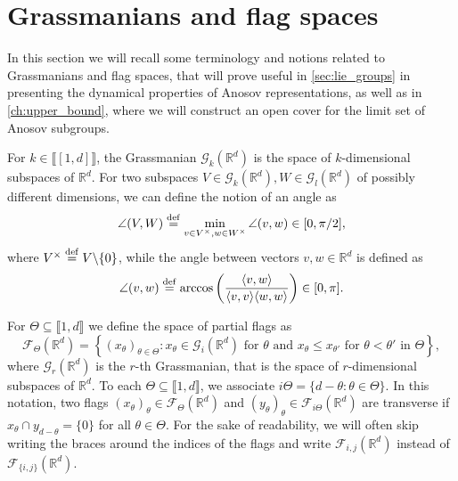 \documentclass{report}
\begin{document}
\section{Grassmanians and flag spaces}
In this section we will recall some terminology and notions related to Grassmanians and flag spaces, that will prove useful in \cref{sec:lie_groups} in presenting the dynamical properties of Anosov representations, as well as in \cref{ch:upper_bound}, where we will construct an open cover for the limit set of Anosov subgroups.

For $k \in \llbracket [1, d] \rrbracket$, the Grassmanian $\mathcal G_k(\mathbb R^d)$ is the space of $k$-dimensional subspaces of $\mathbb R^d$.
For two subspaces $V \in \mathcal G_k(\mathbb R^d), W \in \mathcal G_l(\mathbb R^d)$ of possibly different dimensions, we can define the notion of an angle as
\[
\angle (V, W) \overset{\mathrm{def}}{=} \min_{v \in V^\times, w \in W^\times} \angle(v,w) \in [0, \pi/2],
\]
where $V^\times \overset{\mathrm{def}}{=} V \backslash \{0\}$, while the angle between vectors $v, w \in \mathbb R^d$ is defined as
\[
\angle(v,w) \overset{\mathrm{def}}{=} \arccos \left( \frac{\langle v,w \rangle}{\langle v, v \rangle \langle w, w \rangle} \right) \in [0, \pi].
\]


For $\Theta \subseteq \llbracket 1, d \rrbracket$ we define the space of partial flags as
$$\mathcal F_\Theta(\mathbb R^d) = \left\{ (x_\theta)_{\theta \in \Theta} : x_\theta \in \mathcal G_i(\mathbb R^d) \text{ for } \theta \text{ and } x_{\theta} \leq x_{\theta'} \text{ for } \theta < \theta' \text{ in } \Theta \right\}, $$
where $\mathcal G_r(\mathbb R^d)$ is the $r$-th Grassmanian, that is the space of $r$-dimensional subspaces of $\mathbb R^d$.
To each $\Theta \subseteq \llbracket 1, d \rrbracket$, we associate $i\Theta = \{ d - \theta : \theta \in \Theta \}$. 
In this notation, two flags $(x_\theta)_\theta \in \mathcal F_\Theta(\mathbb R^d)$ and $(y_{\theta})_\theta \in \mathcal F_{i\Theta}(\mathbb R^d)$ are transverse if $x_\theta \cap y_{d-\theta} = \{0\}$ for all $\theta \in \Theta$.
For the sake of readability, we will often skip writing the braces around the indices of the flags and write $\mathcal F_{i,j}(\mathbb R^d)$ instead of $\mathcal F_{\{i,j\}}(\mathbb R^d)$.
\end{document}
